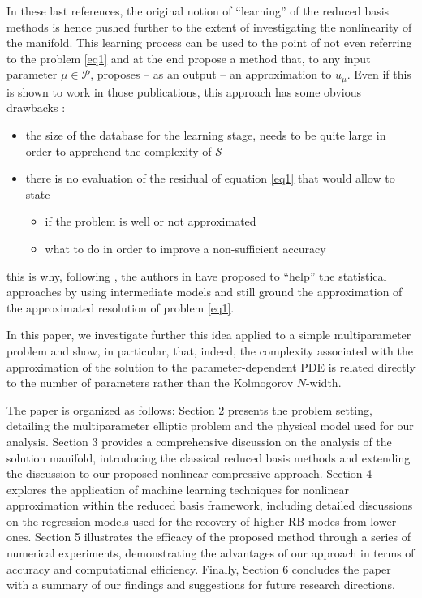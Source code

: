 \documentclass[graybox]{svmult}
\begin{document}
In these last references, the original notion of ``learning'' of the reduced basis methods is hence pushed further to the extent of investigating the nonlinearity of the manifold. This learning process can be used to the point of not even referring to the problem \eqref{eq1} and at the end propose a method that, to any input parameter $\mu\in {\mathcal P}$, proposes -- as an output -- an approximation to $u_\mu$. Even if this is shown to work in those publications, this approach has some obvious drawbacks : 
 \begin{itemize}
     \item the size of the database for the learning stage, needs to be quite large in order to apprehend the complexity of $\mathcal{S}$
     \item there is no evaluation of the residual of equation  \eqref{eq1} that would allow to state 
     \begin{itemize}
         \item if the problem is well or not approximated 
         \item what to do in order to improve a non-sufficient accuracy
     \end{itemize}
     
 \end{itemize}
 this is why, following \cite{barnett2022quadratic, Geelen2023}, the authors in \cite{barnett2023, cohen2023nonlinear} have proposed to ``help'' the statistical approaches by using intermediate models and still ground the approximation of the approximated resolution of problem \eqref{eq1}.
 
In this paper, we investigate further this idea applied to a simple multiparameter problem and show, in particular, that, indeed, the complexity associated with the approximation of the solution to the parameter-dependent PDE is related directly to the number of parameters rather than the Kolmogorov $N$-width.

\bigskip

The paper is organized as follows: Section 2 presents the problem setting, detailing the multiparameter elliptic problem and the physical model used for our analysis. Section 3 provides a comprehensive discussion on the analysis of the solution manifold, introducing the classical reduced basis methods and extending the discussion to our proposed nonlinear compressive approach. Section 4 explores the application of machine learning techniques for nonlinear approximation within the reduced basis framework, including detailed discussions on the regression models used for the recovery of higher RB modes from lower ones. Section 5 illustrates the efficacy of the proposed method through a series of numerical experiments, demonstrating the advantages of our approach in terms of accuracy and computational efficiency. Finally, Section 6 concludes the paper with a summary of our findings and suggestions for future research directions. 
\end{document}

